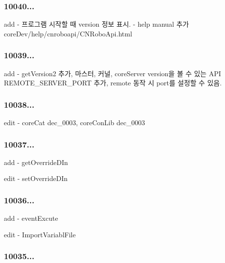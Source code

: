 \subsubsection*{10040...}

\begin{DoxyVerb}      add  - 프로그램 시작할 때 version 정보 표시.
           - help manual 추가 coreDev/help/cnroboapi/CNRoboApi.html
\end{DoxyVerb}


\subsubsection*{10039...}

\begin{DoxyVerb}      add  - getVersion2 추가, 마스터, 커널, coreServer version을 볼 수 있는 API
             REMOTE_SERVER_PORT 추가, remote 동작 시 port를 설정할 수 있음.
\end{DoxyVerb}


\subsubsection*{10038... }

\begin{DoxyVerb}      edit - coreCat dec_0003, coreConLib dec_0003
\end{DoxyVerb}


\subsubsection*{10037... }

\begin{DoxyVerb}      add - getOverrideDIn

     edit - setOverrideDIn
\end{DoxyVerb}


\subsubsection*{10036... }

\begin{DoxyVerb}      add - eventExcute

     edit - ImportVariablFile
\end{DoxyVerb}


\subsubsection*{10035... }

